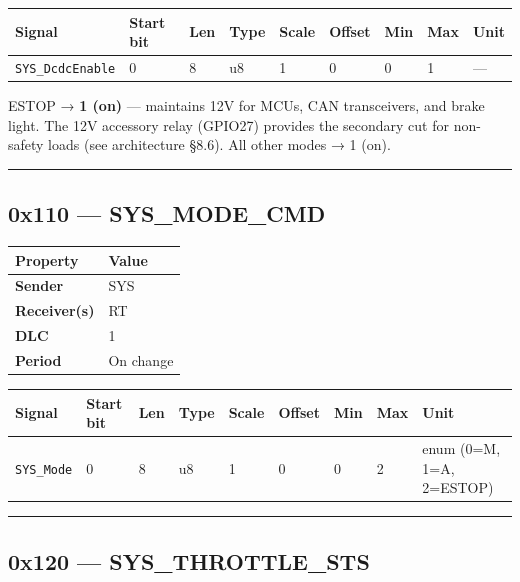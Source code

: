 \documentclass[12pt,a4paper,oneside]{report}
\begin{document}
\begin{longtable}[]{@{}lllllllll@{}}
\toprule\noalign{}
Signal & Start bit & Len & Type & Scale & Offset & Min & Max & Unit \\
\midrule\noalign{}
\endhead
\bottomrule\noalign{}
\endlastfoot
\texttt{SYS\_DcdcEnable} & 0 & 8 & u8 & 1 & 0 & 0 & 1 & --- \\
\end{longtable}

ESTOP → \textbf{1 (on)} --- maintains 12V for MCUs, CAN transceivers, and brake
light. The 12V accessory relay (GPIO27) provides the secondary cut for
non-safety loads (see architecture §8.6). All other modes → 1 (on).

\begin{center}\rule{0.5\linewidth}{0.5pt}\end{center}

\subsection{0x110 --- SYS\_MODE\_CMD}\label{x110-sys_mode_cmd}

\begin{longtable}[]{@{}ll@{}}
\toprule\noalign{}
Property & Value \\
\midrule\noalign{}
\endhead
\bottomrule\noalign{}
\endlastfoot
\textbf{Sender} & SYS \\
\textbf{Receiver(s)} & RT \\
\textbf{DLC} & 1 \\
\textbf{Period} & On change \\
\end{longtable}

\begin{longtable}[]{@{}lllllllll@{}}
\toprule\noalign{}
Signal & Start bit & Len & Type & Scale & Offset & Min & Max & Unit \\
\midrule\noalign{}
\endhead
\bottomrule\noalign{}
\endlastfoot
\texttt{SYS\_Mode} & 0 & 8 & u8 & 1 & 0 & 0 & 2 & enum (0=M, 1=A, 2=ESTOP) \\
\end{longtable}

\begin{center}\rule{0.5\linewidth}{0.5pt}\end{center}

\subsection{0x120 --- SYS\_THROTTLE\_STS}\label{x120-sys_throttle_sts}
\end{document}
